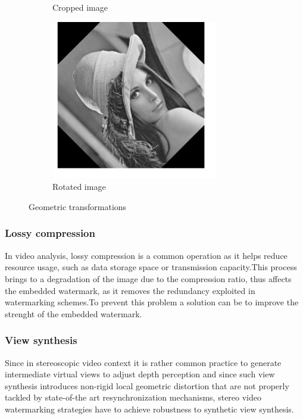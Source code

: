 \begin{figure}[h!]
\begin{subfigure}[]{0.4\textwidth}
\caption{\small{Cropped image}}
\label{fig:geom2}
  \end{subfigure}
\begin{subfigure}[]{0.4\textwidth}
\centering
\includegraphics[width=0.8\textwidth]{./img/rot.png}
\caption{\small{Rotated image}}
\label{fig:geom3}
\end{subfigure}
\caption{\small{Geometric transformations}\label{geom}}
\end{figure}

\subsubsection{Lossy compression}
In video analysis, lossy compression is a common operation as it helps reduce resource usage, such as data storage space or transmission capacity.\newline  This process brings to a degradation of the image due to the compression ratio, thus affects the embedded watermark, as it removes the redundancy exploited in
watermarking schemes.\newline To prevent this problem a solution can be to improve the strenght of the embedded watermark.

\subsubsection{View synthesis}
Since in stereoscopic video context it is rather common practice to generate intermediate virtual views to adjust depth perception and since such view synthesis introduces non-rigid local geometric distortion that are not properly tackled by state-of-the art resynchronization mechanisms, stereo video watermarking strategies have to achieve robustness to synthetic view synthesis.\\

